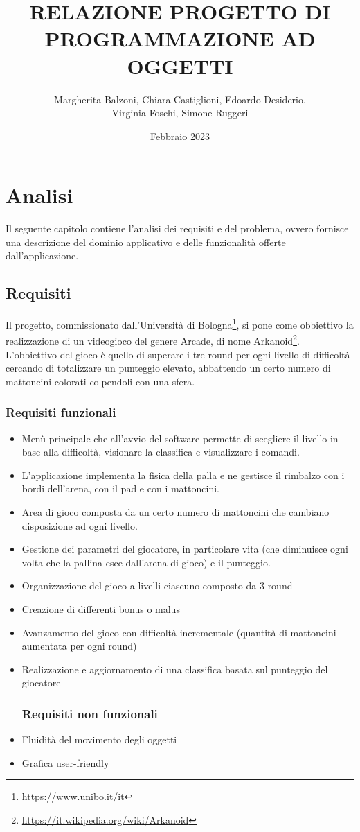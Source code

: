 \documentclass[a4paper,12pt]{report}
\title{RELAZIONE PROGETTO DI PROGRAMMAZIONE AD OGGETTI}
\author{Margherita Balzoni, Chiara Castiglioni, Edoardo Desiderio, \\Virginia Foschi, Simone Ruggeri}
\date{Febbraio 2023}
\begin{document}
\maketitle
\titlepage
\tableofcontents
\newpage

\chapter{Analisi}
Il seguente capitolo contiene l'analisi dei requisiti e del problema, ovvero fornisce una descrizione del dominio applicativo e delle funzionalità offerte dall'applicazione.
\section{Requisiti}
Il progetto, commissionato dall'Università di Bologna\footnote{\url{https://www.unibo.it/it}}, si pone come obbiettivo la realizzazione di un videogioco del genere Arcade, di nome Arkanoid\footnote{\url{https://it.wikipedia.org/wiki/Arkanoid}}.\\L'obbiettivo del gioco è quello di superare i tre round per ogni livello di difficoltà cercando di totalizzare un punteggio elevato, abbattendo un certo numero di mattoncini colorati colpendoli con una sfera.
\\
\subsection*{Requisiti funzionali}
\begin{itemize}
    \item Menù principale che all'avvio del software permette di scegliere il livello in base alla difficoltà, visionare la classifica e visualizzare i comandi.
    \item L’applicazione implementa la fisica della palla e ne gestisce il rimbalzo con i bordi dell’arena, con il pad e con i mattoncini.
    \item Area di gioco composta da un certo numero di mattoncini che cambiano disposizione ad ogni livello.
    \item Gestione dei parametri del giocatore, in particolare vita (che diminuisce ogni volta che la pallina esce dall'arena di gioco) e il punteggio.
    \item Organizzazione del gioco a livelli ciascuno composto da 3 round
    \item Creazione di differenti bonus o malus
    \item Avanzamento del gioco con difficoltà incrementale (quantità di mattoncini aumentata per ogni round)
    \item Realizzazione e aggiornamento di una classifica basata sul punteggio del giocatore
          \subsection*{Requisiti non funzionali}
    \item Fluidità del movimento degli oggetti
    \item Grafica user-friendly
\end{itemize}
\end{document}
